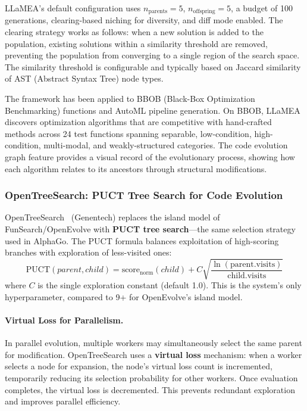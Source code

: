 LLaMEA's default configuration uses $n_{\text{parents}}=5$, $n_{\text{offspring}}=5$, a budget of 100 generations, clearing-based niching for diversity, and diff mode enabled. The clearing strategy works as follows: when a new solution is added to the population, existing solutions within a similarity threshold are removed, preventing the population from converging to a single region of the search space. The similarity threshold is configurable and typically based on Jaccard similarity of AST (Abstract Syntax Tree) node types.

The framework has been applied to BBOB (Black-Box Optimization Benchmarking) functions and AutoML pipeline generation. On BBOB, LLaMEA discovers optimization algorithms that are competitive with hand-crafted methods across 24 test functions spanning separable, low-condition, high-condition, multi-modal, and weakly-structured categories. The code evolution graph feature provides a visual record of the evolutionary process, showing how each algorithm relates to its ancestors through structural modifications.


\subsubsection{OpenTreeSearch: PUCT Tree Search for Code Evolution}

OpenTreeSearch~\citep{genentech2025opentreesearch} (Genentech) replaces the island model of FunSearch/OpenEvolve with \textbf{PUCT tree search}---the same selection strategy used in AlphaGo. The PUCT formula balances exploitation of high-scoring branches with exploration of less-visited ones:
\begin{equation}
\text{PUCT}(parent, child) = \text{score}_{\text{norm}}(child) + C\sqrt{\frac{\ln(\text{parent.visits})}{\text{child.visits}}}
\end{equation}
where $C$ is the single exploration constant (default 1.0). This is the system's only hyperparameter, compared to 9+ for OpenEvolve's island model.

\paragraph{Virtual Loss for Parallelism.}
In parallel evolution, multiple workers may simultaneously select the same parent for modification. OpenTreeSearch uses a \textbf{virtual loss} mechanism: when a worker selects a node for expansion, the node's virtual loss count is incremented, temporarily reducing its selection probability for other workers. Once evaluation completes, the virtual loss is decremented. This prevents redundant exploration and improves parallel efficiency.

